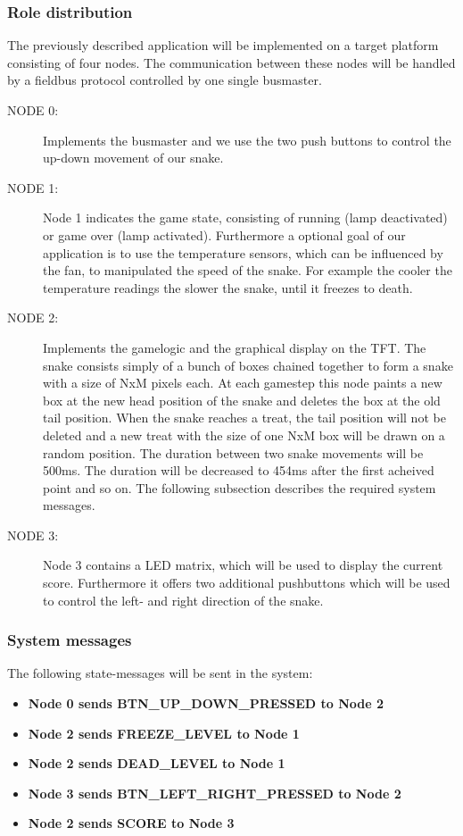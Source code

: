 \subsubsection{Role distribution}
The previously described application will be implemented on a target platform
consisting of four nodes. The communication between these nodes will be handled
by a fieldbus protocol controlled by one single busmaster.
\begin{description}
\item[NODE 0:]
Implements the busmaster and we use the two push buttons to control the up-down
movement of our snake.
\item[NODE 1:]
Node 1 indicates the game state, consisting of running (lamp deactivated) or game over
(lamp activated). Furthermore a optional goal of our application is to use the 
temperature sensors, which can be influenced by the fan, to manipulated the speed
of the snake. For example the cooler the temperature readings the slower the snake, until
it freezes to death. 
\item[NODE 2:]
Implements the gamelogic and the graphical display on the TFT. The snake consists 
simply of a bunch of boxes chained together to form a snake with a size of NxM 
pixels each. At each gamestep this node paints a new box at the new head position
of the snake and deletes the box at the old tail position. When the snake reaches
a treat, the tail position will not be deleted and a new treat with the size of 
one NxM box will be drawn on a random position. The duration between two snake 
movements will be 500ms. The duration will be decreased to 454ms after the first
acheived point and so on. The following subsection describes the required system
messages.
\item[NODE 3:]
Node 3 contains a LED matrix, which will be used to display the current score. 
Furthermore it offers two additional pushbuttons which will be used to control
the left- and right direction of the snake.
\end{description}

 

\subsubsection{System messages}

The following state-messages will be sent in the system:

\begin{itemize}
  \item \textbf{Node 0 sends BTN\_UP\_DOWN\_PRESSED to Node 2}
  \item \textbf{Node 2 sends FREEZE\_LEVEL to Node 1}
  \item \textbf{Node 2 sends DEAD\_LEVEL to Node 1}
  \item \textbf{Node 3 sends BTN\_LEFT\_RIGHT\_PRESSED to Node 2}
  \item \textbf{Node 2 sends SCORE to Node 3}
\end{itemize}

